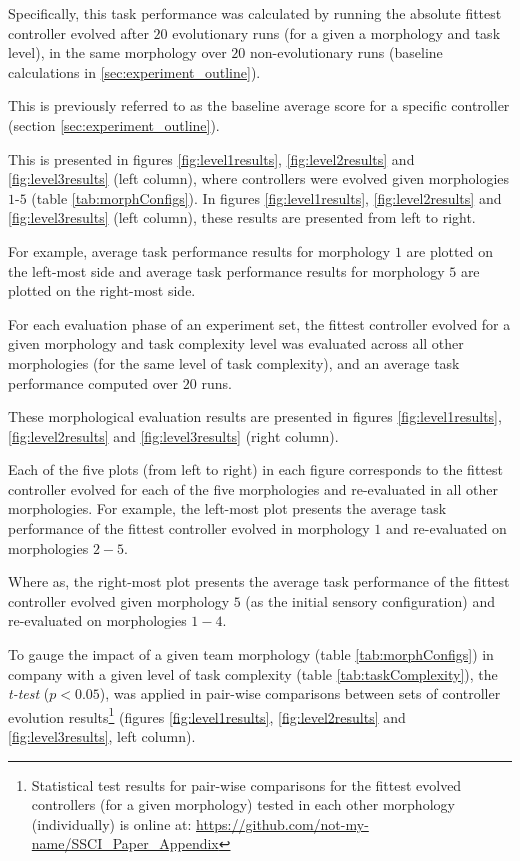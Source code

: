 Specifically, this task performance was calculated by running the absolute fittest controller
evolved after $20$ evolutionary runs (for a given a morphology and task level),
in the same morphology over $20$ non-evolutionary runs (baseline calculations in \ref{sec:experiment_outline}).

This is previously referred to as the baseline average score for a specific controller (section \ref{sec:experiment_outline}).

This is presented in figures \ref{fig:level1results}, \ref{fig:level2results} and \ref{fig:level3results}
(left column), where controllers were evolved given morphologies $1$-$5$ (table \ref{tab:morphConfigs}).
In figures \ref{fig:level1results}, \ref{fig:level2results} and \ref{fig:level3results} (left column),
these results are presented from left to right.

For example, average task performance results for morphology $1$ are plotted on the left-most side
and average task performance results for morphology $5$ are plotted on the right-most side.

For each evaluation phase of an experiment set, the fittest controller evolved for a given morphology and task complexity
level was evaluated across all other morphologies (for the same level of task complexity), and an
average task performance computed over $20$ runs.

These morphological evaluation results are presented in figures \ref{fig:level1results}, \ref{fig:level2results}
and \ref{fig:level3results} (right column).

Each of the five plots (from left to right) in each figure corresponds to the fittest controller evolved for each of the
five morphologies and re-evaluated in all other morphologies.  
For example, the left-most plot presents
the average task performance of the fittest controller evolved in morphology $1$ and re-evaluated on morphologies $2-5$.

Where as, the right-most plot presents the average task performance of the fittest controller evolved given morphology $5$
(as the initial sensory configuration) and re-evaluated on morphologies $1-4$.

To gauge the impact of a given team morphology (table \ref{tab:morphConfigs})
in company with a given level of task complexity (table \ref{tab:taskComplexity}),
the \textit{t-test} \cite{FlanneryTeukolsky1986} ($p < 0.05$),
was applied in pair-wise comparisons between sets of controller evolution
results\footnote{Statistical test results for pair-wise comparisons for the fittest evolved controllers
(for a given morphology) tested in each other morphology (individually) is online at:
\url{https://github.com/not-my-name/SSCI_Paper_Appendix}}
(figures \ref{fig:level1results}, \ref{fig:level2results} and \ref{fig:level3results}, left column).

